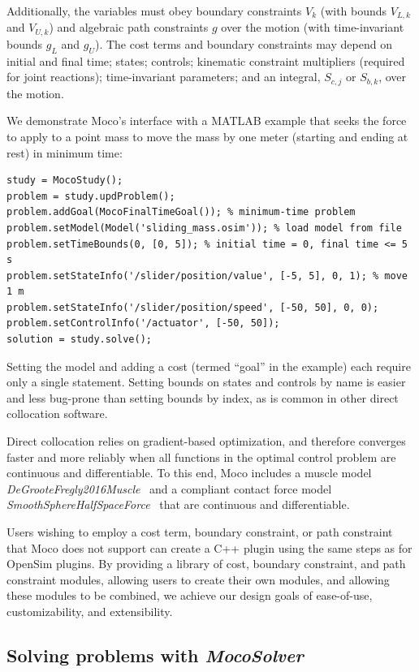 \documentclass[10pt,letterpaper]{article}
\begin{document}
Additionally, the variables must obey boundary constraints $V_k$ (with bounds $V_{L,k}$ and $V_{U,k}$) and algebraic path constraints $g$ over the motion (with time-invariant bounds $g_L$ and $g_U$). The cost terms and boundary constraints may depend on initial and final time; states; controls; kinematic constraint multipliers (required for joint reactions); time-invariant parameters; and an integral, $S_{c,j}$ or $S_{b,k}$, over the motion.

We demonstrate Moco's interface with a MATLAB example that seeks the force to apply to a point mass to move the mass by one meter (starting and ending at rest) in minimum time:
\begin{lstlisting}
study = MocoStudy();
problem = study.updProblem();
problem.addGoal(MocoFinalTimeGoal()); % minimum-time problem
problem.setModel(Model('sliding_mass.osim')); % load model from file
problem.setTimeBounds(0, [0, 5]); % initial time = 0, final time <= 5 s
problem.setStateInfo('/slider/position/value', [-5, 5], 0, 1); % move 1 m
problem.setStateInfo('/slider/position/speed', [-50, 50], 0, 0);
problem.setControlInfo('/actuator', [-50, 50]);
solution = study.solve();
\end{lstlisting}
Setting the model and adding a cost (termed ``goal'' in the example) each
require only a single statement. Setting bounds on states and controls by name is easier and less bug-prone than setting bounds by index, as is common in other direct collocation software.

Direct collocation relies on gradient-based optimization, and therefore converges faster and more reliably when all functions in the optimal control problem are continuous and differentiable. To this end, Moco includes a muscle model \textit{DeGrooteFregly2016Muscle}~\cite{Groote:2016dq} and a compliant contact force model \textit{SmoothSphereHalfSpaceForce}~\cite{Serrancoli:2019aa} that are continuous and differentiable.

Users wishing to employ a cost term, boundary constraint, or path constraint that Moco does not support can create a C++ plugin using the same steps as for OpenSim plugins. By providing a library of cost, boundary constraint, and path constraint modules, allowing users to create their own modules, and allowing these modules to be combined, we achieve our design goals of ease-of-use, customizability, and extensibility.


\subsection*{Solving problems with \textit{MocoSolver}}
\end{document}
